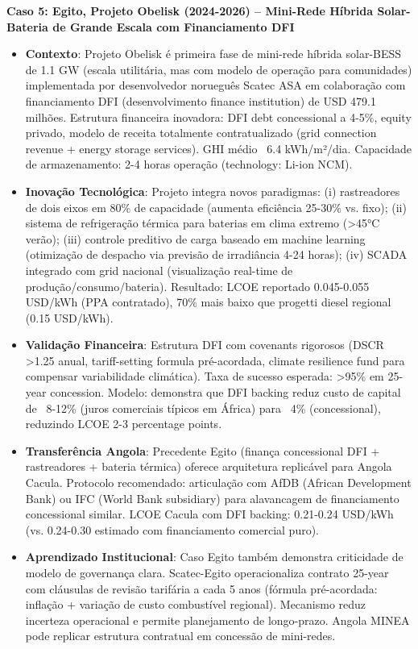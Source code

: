 \documentclass[12pt, a4paper]{article}
\begin{document}
\textbf{Caso 5: Egito, Projeto Obelisk (2024-2026) – Mini-Rede Híbrida Solar-Bateria de Grande Escala com Financiamento DFI}
\begin{itemize}
\item \textbf{Contexto}: Projeto Obelisk é primeira fase de mini-rede híbrida solar-BESS de 1.1 GW (escala utilitária, mas com modelo de operação para comunidades) implementada por desenvolvedor norueguês Scatec ASA em colaboração com financiamento DFI (desenvolvimento finance institution) de USD 479.1 milhões. Estrutura financeira inovadora: DFI debt concessional a 4-5\%, equity privado, modelo de receita totalmente contratualizado (grid connection revenue + energy storage services). GHI médio ~6.4 kWh/m²/dia. Capacidade de armazenamento: 2-4 horas operação (technology: Li-ion NCM).
\item \textbf{Inovação Tecnológica}: Projeto integra novos paradigmas: (i) rastreadores de dois eixos em 80\% de capacidade (aumenta eficiência 25-30\% vs. fixo); (ii) sistema de refrigeração térmica para baterias em clima extremo (>45°C verão); (iii) controle preditivo de carga baseado em machine learning (otimização de despacho via previsão de irradiância 4-24 horas); (iv) SCADA integrado com grid nacional (visualização real-time de produção/consumo/bateria). Resultado: LCOE reportado 0.045-0.055 USD/kWh (PPA contratado), 70\% mais baixo que progetti diesel regional (0.15 USD/kWh).
\item \textbf{Validação Financeira}: Estrutura DFI com covenants rigorosos (DSCR >1.25 anual, tariff-setting formula pré-acordada, climate resilience fund para compensar variabilidade climática). Taxa de sucesso esperada: >95\% em 25-year concession. Modelo: demonstra que DFI backing reduz custo de capital de ~8-12\% (juros comerciais típicos em África) para ~4\% (concessional), reduzindo LCOE 2-3 percentage points.
\item \textbf{Transferência Angola}: Precedente Egito (finança concessional DFI + rastreadores + bateria térmica) oferece arquitetura replicável para Angola Cacula. Protocolo recomendado: articulação com AfDB (African Development Bank) ou IFC (World Bank subsidiary) para alavancagem de financiamento concessional similar. LCOE Cacula com DFI backing: 0.21-0.24 USD/kWh (vs. 0.24-0.30 estimado com financiamento comercial puro).
\item \textbf{Aprendizado Institucional}: Caso Egito também demonstra criticidade de modelo de governança clara. Scatec-Egito operacionaliza contrato 25-year com cláusulas de revisão tarifária a cada 5 anos (fórmula pré-acordada: inflação + variação de custo combustível regional). Mecanismo reduz incerteza operacional e permite planejamento de longo-prazo. Angola MINEA pode replicar estrutura contratual em concessão de mini-redes.
\end{itemize}
\end{document}
